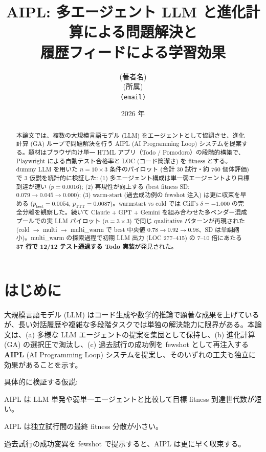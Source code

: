 \documentclass[a4paper,11pt]{ltjsarticle}
\title{\textbf{AIPL}: 多エージェント LLM と進化計算による問題解決と\\
       履歴フィードによる学習効果}
\author{(著者名)\\(所属)\\\texttt{\small (email)}}
\date{2026 年}
\begin{document}
\maketitle

\begin{abstract}
本論文では、複数の大規模言語モデル (LLM) をエージェントとして協調させ、進化計算 (GA) ループで問題解決を行う AIPL (AI Programming Loop) システムを提案する。題材はブラウザ向け単一 HTML アプリ（Todo / Pomodoro）の段階的構築で、Playwright による自動テスト合格率と LOC (コード簡潔さ) を fitness とする。dummy LLM を用いた $n = 10 \times 3$ 条件のパイロット (合計 30 試行・約 760 個体評価) で 3 仮説を統計的に検証した: (1) 多エージェント構成は単一弱エージェントより目標到達が速い ($p = 0.0016$); (2) 再現性が向上する (best fitness SD: $0.079 \to 0.045 \to 0.000$); (3) warm-start (過去成功例の fewshot 注入) は更に収束を早める ($p_{\text{best}} = 0.0054$, $p_{\text{TTT}} = 0.0087$)。warmstart vs cold では Cliff's $\delta = -1.000$ の完全分離を観察した。続いて Claude + GPT + Gemini を組み合わせた多ベンダー混成プールでの実 LLM パイロット ($n=3 \times 3$) で同じ qualitative パターンが再現された (cold $\to$ multi $\to$ multi\_warm で best 中央値 $0.78 \to 0.92 \to 0.98$、SD は単調縮小)。multi\_warm の探索過程で初期 LLM 出力 (LOC 277--415) の 7--10 倍にあたる \textbf{37 行で 12/12 テスト通過する Todo 実装}が発見された。
\end{abstract}

\section{はじめに}

大規模言語モデル (LLM) はコード生成や数学的推論で顕著な成果を上げているが、長い対話履歴や複雑な多段階タスクでは単独の解決能力に限界がある。本論文は、(a) 多様な LLM エージェントの提案を集団として保持し、(b) 進化計算 (GA) の選択圧で淘汰し、(c) 過去試行の成功例を fewshot として再注入する \textbf{AIPL} (AI Programming Loop) システムを提案し、そのいずれの工夫も独立に効果があることを示す。

具体的に検証する仮説:
\begin{description}[leftmargin=2em,itemsep=2pt]
  \item[H1 (進化速度)] AIPL は LLM 単発や弱単一エージェントと比較して目標 fitness 到達世代数が短い。
  \item[H2 (再現性)] AIPL は独立試行間の最終 fitness 分散が小さい。
  \item[H3 (履歴学習)] 過去試行の成功変異を fewshot で提示すると、AIPL は更に早く収束する。
\end{description}
\end{document}
